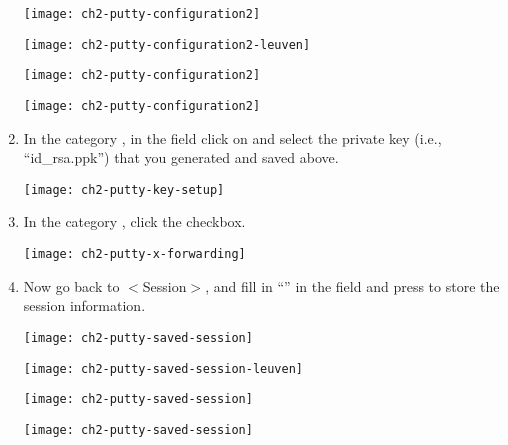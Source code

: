 \begin{enumerate}
\ifantwerpen
      \begin{center}
      \texttt{[image: ch2-putty-configuration2]}
      \end{center}
\fi
\ifleuven
      \begin{center}
      \texttt{[image: ch2-putty-configuration2-leuven]}
      \end{center}
\fi
\ifbrussel
      \begin{center}
      \texttt{[image: ch2-putty-configuration2]}
      \end{center}
\fi
\ifgent
      \begin{center}
      \texttt{[image: ch2-putty-configuration2]}
      \end{center}
\fi

    \item  In the category , in the
      field  click on
       and select the private key (i.e., ``id\_rsa.ppk'')
      that you generated and saved above.

      \begin{center}
      \texttt{[image: ch2-putty-key-setup]}
      \end{center}

    \item  In the category , click
      the  checkbox.

      \begin{center}
      \texttt{[image: ch2-putty-x-forwarding]}
      \end{center}

    \item  Now go back to $<$Session$>$, and fill in ``\emph{\hpcname}'' in the
       field and press  to
      store the session information.

\ifantwerpen
      \begin{center}
      \texttt{[image: ch2-putty-saved-session]}
      \end{center}
\fi
\ifleuven
      \begin{center}
      \texttt{[image: ch2-putty-saved-session-leuven]}
      \end{center}
\fi
\ifbrussel
      \begin{center}
      \texttt{[image: ch2-putty-saved-session]}
      \end{center}
\fi
\ifgent
      \begin{center}
      \texttt{[image: ch2-putty-saved-session]}
      \end{center}
\fi



\end{enumerate}
